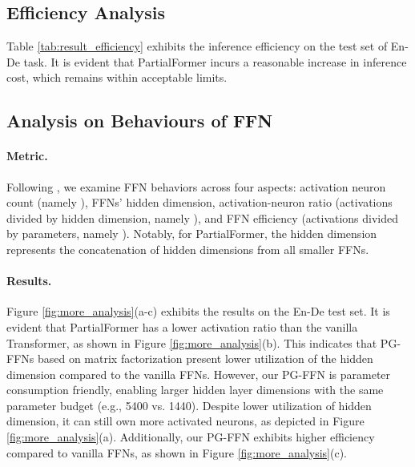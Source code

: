 \documentclass[11pt]{article}
\begin{document}
\subsection{Efficiency Analysis}
Table \ref{tab:result_efficiency} exhibits the inference efficiency on the test set of En-De task. It is evident that PartialFormer incurs a reasonable increase in inference cost, which remains within acceptable limits.








\subsection{Analysis on Behaviours of FFN}
\paragraph{Metric.} 



Following \citet{zhang-etal-2022-moefication}, we examine FFN behaviors across four aspects: activation neuron count (namely ), FFNs' hidden dimension, activation-neuron ratio (activations divided by hidden dimension, namely ), and FFN efficiency (activations divided by parameters, namely ). Notably, for PartialFormer, the hidden dimension represents the concatenation of hidden dimensions from all smaller FFNs. 



\paragraph{Results.}


Figure \ref{fig:more_analysis}(a-c) exhibits the results on the En-De test set. It is evident that PartialFormer has a lower activation ratio than the vanilla Transformer, as shown in Figure \ref{fig:more_analysis}(b). This indicates that PG-FFNs based on matrix factorization present lower utilization of the hidden dimension compared to the vanilla FFNs. However, our PG-FFN is parameter consumption friendly, enabling larger hidden layer dimensions with the same parameter budget (e.g., 5400 vs. 1440). Despite lower utilization of hidden dimension, it can still own more activated neurons, as depicted in Figure \ref{fig:more_analysis}(a). Additionally, our PG-FFN exhibits higher efficiency compared to vanilla FFNs, as shown in Figure \ref{fig:more_analysis}(c). 
\end{document}
